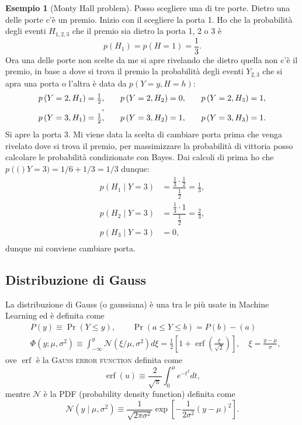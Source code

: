 \documentclass[10pt]{article}
\DeclareMathOperator{\pr}{Pr}
\DeclareMathOperator{\erf}{erf}
\newcommand{\im}[1]{\textsc{#1}}
\newcommand{\cond}{\mid}
\newcommand{\pare}[1]{
	\ensuremath{\left(#1\right)}
}
\newcommand{\spare}[1]{
	\ensuremath{\left[#1\right]}
}
\theoremstyle{definition}
\newtheorem{example}{Esempio}[section]
\begin{document}
\begin{example}[Monty Hall problem]
Posso scegliere una di tre porte. Dietro una delle porte c'è un premio. Inizio
con il scegliere la porta 1. Ho che la probabilità degli eventi $H_{1,2,3}$ che
il premio sia dietro la porta 1, 2 o 3 è
\[
p\pare{H_1} = p\pare{H=1} = \frac{1}{3}.
\]
Ora una delle porte non scelte da me si apre rivelando che dietro quella non c'è
il premio, in base a dove si trova il premio la probabilità degli eventi $Y_{2,
3}$ che si apra una porta o l'altra è data da $p\pare{Y=y, H=h}$:
\[
\begin{array}{l@{,\qquad}l@{,\qquad}l}
p\pare{Y=2, H_1} = \frac{1}{2} & p\pare{Y=2, H_2} = 0 & p\pare{Y=2, H_3} = 1, \\
\\
p\pare{Y=3, H_1} = \frac{1}{2} & p\pare{Y=3, H_2} = 1 & p\pare{Y=3, H_3} = 1. \\
\end{array}
\]
Si apre la porta 3. Mi viene data la scelta di cambiare porta prima che venga
rivelato dove si trova il premio, per massimizzare la probabilità di vittoria
posso calcolare le probabilità condizionate con Bayes. Dai calcoli di prima ho
che $p\pare(Y=3) = 1/6 + 1/3 = 1/3$ dunque:
\begin{equation}
\begin{split}
p\pare{H_1\cond Y=3} &= \dfrac{\frac{1}{3}\cdot\frac{1}{2}}{\frac{1}{2}} = \frac{1}{3}, \\
p\pare{H_2\cond Y=3} &= \dfrac{\frac{1}{3}\cdot 1}{\frac{1}{2}} = \frac{2}{3}, \\
p\pare{H_3\cond Y=3} &= 0, \\
\end{split}
\end{equation}
dunque mi conviene cambiare porta.
\end{example}

\subsection{Distribuzione di Gauss}
La distribuzione di Gauss (o gaussiana) è una tra le più usate in Machine Learning ed è definita come
\begin{equation}
\begin{split}
&P\pare{y} \equiv \pr\pare{Y\leq y},\qquad \pr\pare{a \leq Y \leq b} = P\pare{b} - \pare{a} \\
&\Phi\pare{y;\mu, \sigma^2} \equiv \int_{-\infty}^y \mathcal{N}\pare{\xi/\mu, \sigma^2}d\xi = \frac{1}{2}\spare{1 + \erf\pare{\frac{\xi}{\sqrt{2}}}},\quad \xi = \frac{y - \mu}{\sigma},
\end{split}
\end{equation}
ove $\erf$ è la \im{Gauss error function} definita come
\begin{equation}
\erf\pare{u} \equiv \frac{2}{\sqrt{\pi}} \int_0^\mu e^{-t^2}dt,
\end{equation}
mentre $\mathcal{N}$ è la PDF (probability density function) definita come
\begin{equation}
\mathcal{N}\pare{y\cond\mu,\sigma^2} \equiv \frac{1}{\sqrt{2\pi\sigma^2}}\exp\spare{-\frac{1}{2\sigma^2}\pare{y-\mu}^2}.
\end{equation}
\end{document}
